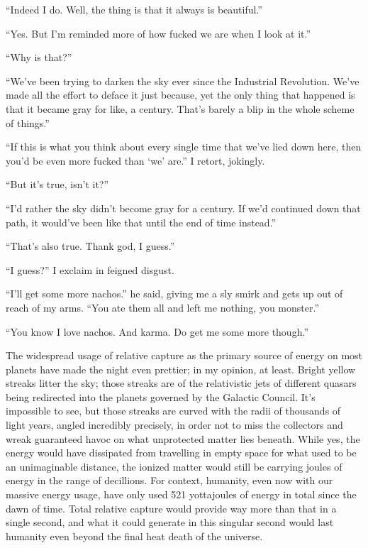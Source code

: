 \documentclass{book}
\begin{document}
			``Indeed I do. Well, the thing is that it always is beautiful.''

			``Yes. But I'm reminded more of how fucked we are when I look at it.''

			``Why is that?''

			``We've been trying to darken the sky ever since the Industrial Revolution. We've
			made all the effort to deface it just because, yet the only thing that happened is
			that it became gray for like, a century. That's barely a blip in the whole scheme of
			things.''

			``If this is what you think about every single time that we've lied down here, then
			you'd be even more fucked than `we' are.'' I retort, jokingly.

			``But it's true, isn't it?''

			``I'd rather the sky didn't become gray for a century. If we'd continued down that
			path, it would've been like that until the end of time instead.''

			``That's also true. Thank god, I guess.''

			``I guess?'' I exclaim in feigned disgust.

			``I'll get some more nachos.'' he said, giving me a sly smirk and gets up out of reach
			of my arms. ``You ate them all and left me nothing, you monster.''

			``You know I love nachos. And karma. Do get me some more though.''

			The widespread usage of relative capture as the primary source of energy on most
			planets have made the night even prettier; in my opinion, at least. Bright yellow
			streaks litter the sky; those streaks are of the relativistic jets of different quasars
			being redirected into the planets governed by the Galactic Council. It's impossible to
			see, but those streaks are curved with the radii of thousands of light years, angled incredibly
			precisely, in order not to miss the collectors and wreak guaranteed havoc on what
			unprotected matter lies beneath. While yes, the energy would have dissipated from
			travelling in empty space for what used to be an unimaginable distance, the ionized
			matter would still be carrying joules of energy in the range of decillions. For
			context, humanity, even now with our massive energy usage, have only used 521
			yottajoules of energy in total since the dawn of time. Total relative capture would
			provide way more than that in a single second, and what it could generate in this singular
			second would last humanity even beyond the final heat death of the universe.
\end{document}
